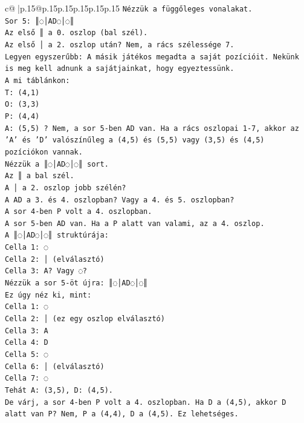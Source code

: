 \documentclass{article}
\begin{document}
{\begin{supertabular}{c@{$\;$}|p{.15\linewidth}@{}p{.15\linewidth}p{.15\linewidth}p{.15\linewidth}p{.15\linewidth}p{.15\linewidth}}
{{{\texttt{Nézzük a függőleges vonalakat.} \\
\texttt{Sor 5: ║◌│AD◌│◌║} \\
\texttt{Az első ║ a 0. oszlop (bal szél).} \\
\texttt{Az első │ a 2. oszlop után? Nem, a rács szélessége 7.} \\
\texttt{Legyen egyszerűbb: A másik játékos megadta a saját pozícióit. Nekünk is meg kell adnunk a sajátjainkat, hogy egyeztessünk.} \\
\texttt{A mi táblánkon:} \\
\texttt{T: (4,1)} \\
\texttt{O: (3,3)} \\
\texttt{P: (4,4)} \\
\texttt{A: (5,5) ? Nem, a sor 5{-}ben AD van. Ha a rács oszlopai 1{-}7, akkor az 'A' és 'D' valószínűleg a (4,5) és (5,5) vagy (3,5) és (4,5) pozíciókon vannak.} \\
\texttt{Nézzük a ║◌│AD◌│◌║ sort.} \\
\texttt{Az ║ a bal szél.} \\
\texttt{A │ a 2. oszlop jobb szélén?} \\
\texttt{A AD a 3. és 4. oszlopban? Vagy a 4. és 5. oszlopban?} \\
\texttt{A sor 4{-}ben P volt a 4. oszlopban.} \\
\texttt{A sor 5{-}ben AD van. Ha a P alatt van valami, az a 4. oszlop.} \\
\texttt{A ║◌│AD◌│◌║ struktúrája:} \\
\texttt{Cella 1: ◌} \\
\texttt{Cella 2: │ (elválasztó)} \\
\texttt{Cella 3: A? Vagy ◌?} \\
\texttt{Nézzük a sor 5{-}öt újra: ║◌│AD◌│◌║} \\
\texttt{Ez úgy néz ki, mint:} \\
\texttt{Cella 1: ◌} \\
\texttt{Cella 2: │ (ez egy oszlop elválasztó)} \\
\texttt{Cella 3: A} \\
\texttt{Cella 4: D} \\
\texttt{Cella 5: ◌} \\
\texttt{Cella 6: │ (elválasztó)} \\
\texttt{Cella 7: ◌} \\
\texttt{Tehát A: (3,5), D: (4,5).} \\
\texttt{De várj, a sor 4{-}ben P volt a 4. oszlopban. Ha D a (4,5), akkor D alatt van P? Nem, P a (4,4), D a (4,5). Ez lehetséges.} \\
}}}
\end{supertabular}}
\end{document}
